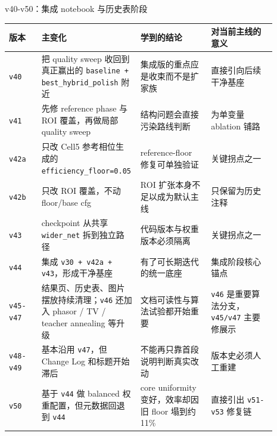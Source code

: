 \documentclass[aspectratio=169,10pt]{ctexbeamer}
\begin{document}
\begin{frame}{v40-v50：集成 notebook 与历史表阶段}
  \scriptsize
  \begin{tabular}{>{\raggedright\arraybackslash}p{0.12\linewidth} >{\raggedright\arraybackslash}p{0.27\linewidth} >{\raggedright\arraybackslash}p{0.26\linewidth} >{\raggedright\arraybackslash}p{0.24\linewidth}}
    \toprule
    版本 & 主变化 & 学到的结论 & 对当前主线的意义 \\
    \midrule
    \texttt{v40} & 把 quality sweep 收回到真正赢出的 \texttt{baseline + best\_hybrid\_polish} 附近 & 集成版的重点应是收束而不是扩家族 & 直接引向后续干净基座 \\
    \texttt{v41} & 先修 reference phase 与 ROI 覆盖，再做局部 quality sweep & 结构问题会直接污染路线判断 & 为单变量 ablation 铺路 \\
    \texttt{v42a} & 只改 Cell5 参考相位生成的 \texttt{efficiency\_floor=0.05} & reference-floor 修复可单独验证 & 关键拐点之一 \\
    \texttt{v42b} & 只改 ROI 覆盖，不动 floor/base cfg & ROI 扩张本身不足以成为默认主线 & 只保留为历史注释 \\
    \texttt{v43} & checkpoint 从共享 \texttt{wider\_net} 拆到独立路径 & 代码版本与权重版本必须隔离 & 关键拐点之一 \\
    \texttt{v44} & 集成 \texttt{v30 + v42a + v43}，形成干净基座 & 有了可长期迭代的统一底座 & 集成阶段核心锚点 \\
    \texttt{v45-v47} & 结果页、历史表、图片摆放持续清理；\texttt{v46} 还加入 phasor / TV / teacher annealing 等升级 & 文档可读性与算法试验都开始重要 & \texttt{v46} 是重要算法分支，\texttt{v45/v47} 主要修展示 \\
    \texttt{v48-v49} & 基本沿用 \texttt{v47}，但 Change Log 和标题开始滞后 & 不能再只靠首段说明判断真实改动 & 版本史必须人工重建 \\
    \texttt{v50} & 基于 \texttt{v44} 做 balanced 权重配置，但元数据回退到 \texttt{v44} & core uniformity 变好，效率却因旧 floor 塌到约 11\% & 直接引出 \texttt{v51-v53} 修复链 \\
    \bottomrule
  \end{tabular}
\end{frame}
\end{document}
